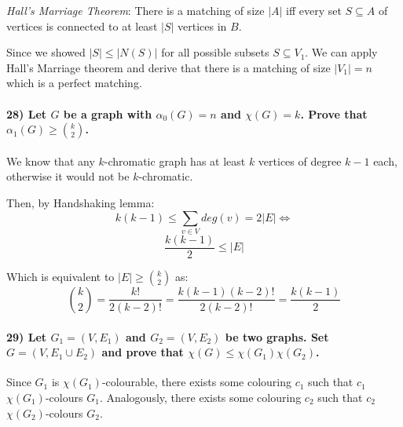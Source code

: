 \documentclass[
]{article}
\begin{document}
\emph{Hall's Marriage Theorem}: There is a matching of size \(|A|\) iff
every set \(S \subseteq A\) of vertices is connected to at least \(|S|\)
vertices in \(B\).

Since we showed \(|S| \leq |N(S)|\) for all possible subsets
\(S \subseteq V_1\). We can apply Hall's Marriage theorem and derive
that there is a matching of size \(|V_1| = n\) which is a perfect
matching.

\hypertarget{let-g-be-a-graph-with-alpha_0g-n-and-chig-k.-prove-that-alpha_1g-geq-binomk2.}{%
\paragraph{\texorpdfstring{28) Let \(G\) be a graph with
\(\alpha_0(G) = n\) and \(\chi(G) = k\). Prove that
\(\alpha_1(G) \geq \binom{k}{2}\).}{28) Let G be a graph with \textbackslash alpha\_0(G) = n and \textbackslash chi(G) = k. Prove that \textbackslash alpha\_1(G) \textbackslash geq \textbackslash binom\{k\}\{2\}.}}\label{let-g-be-a-graph-with-alpha_0g-n-and-chig-k.-prove-that-alpha_1g-geq-binomk2.}}

We know that any \(k\)-chromatic graph has at least \(k\) vertices of
degree \(k-1\) each, otherwise it would not be \(k\)-chromatic.

Then, by Handshaking lemma: \[
k (k-1) \leq \sum_{v \in V} deg(v) = 2 |E| \Leftrightarrow 
\] \[
\frac{k (k-1)}{2} \leq |E|
\]

Which is equivalent to \(|E| \geq \binom{k}{2}\) as: \[
\binom{k}{2}  = \frac{k!}{2(k-2)!} = \frac{k(k-1)(k-2)!}{2(k-2)!} = \frac{k(k-1)}{2}
\]

\hypertarget{let-g_1-v-e_1-and-g_2-v-e_2-be-two-graphs.-set-g-v-e_1-cup-e_2-and-prove-that-chig-leq-chig_1chig_2.}{%
\paragraph{\texorpdfstring{29) Let \(G_1 = (V, E_1)\) and
\(G_2 = (V, E_2)\) be two graphs. Set \(G = (V, E_1 \cup E_2)\) and
prove that
\(\chi(G) \leq \chi(G_1)\chi(G_2)\).}{29) Let G\_1 = (V, E\_1) and G\_2 = (V, E\_2) be two graphs. Set G = (V, E\_1 \textbackslash cup E\_2) and prove that \textbackslash chi(G) \textbackslash leq \textbackslash chi(G\_1)\textbackslash chi(G\_2).}}\label{let-g_1-v-e_1-and-g_2-v-e_2-be-two-graphs.-set-g-v-e_1-cup-e_2-and-prove-that-chig-leq-chig_1chig_2.}}

Since \(G_1\) is \(\chi(G_1)\)-colourable, there exists some colouring
\(c_1\) such that \(c_1\) \(\chi(G_1)\)-colours \(G_1\). Analogously,
there exists some colouring \(c_2\) such that \(c_2\)
\(\chi(G_2)\)-colours \(G_2\).
\end{document}
